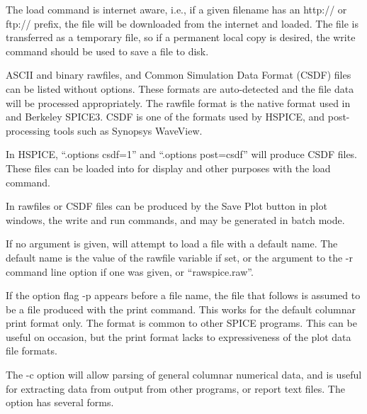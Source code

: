 The {\cb load} command is internet aware, i.e., if a given filename
has an {\vt http://} or {\vt ftp://} prefix, the file will be
downloaded from the internet and loaded.  The file is transferred as a
temporary file, so if a permanent local copy is desired, the {\cb
write} command should be used to save a file to disk.

ASCII and binary rawfiles, and Common Simulation Data Format (CSDF)
files can be listed without options.  These formats are auto-detected
and the file data will be processed appropriately.  The rawfile format
is the native format used in {\WRspice} and Berkeley SPICE3.  CSDF is
one of the formats used by HSPICE, and post-processing tools such as
Synopsys WaveView.

In HSPICE, ``{\vt .options csdf=1}'' and ``{\vt .options post=csdf}''
will produce CSDF files.  These files can be loaded into {\WRspice}
for display and other purposes with the {\cb load} command.

In {\WRspice} rawfiles or CSDF files can be produced by the {\cb Save
Plot} button in {\cb plot} windows, the {\cb write} and {\cb run}
commands, and may be generated in batch mode.

If no argument is given, {\WRspice} will attempt to load a file with a
default name.  The default name is the value of the {\et rawfile}
variable if set, or the argument to the {\vt -r} command line option
if one was given, or ``{\vt rawspice.raw}''.

If the option flag {\vt -p} appears before a file name, the file that
follows is assumed to be a file produced with the {\WRspice} {\cb
print} command.  This works for the default columnar print format
only.  The format is common to other SPICE programs.  This can be
useful on occasion, but the print format lacks to expressiveness of
the plot data file formats.

The {\vt -c} option will allow parsing of general columnar numerical
data, and is useful for extracting data from output from other
programs, or report text files.  The option has several forms.

